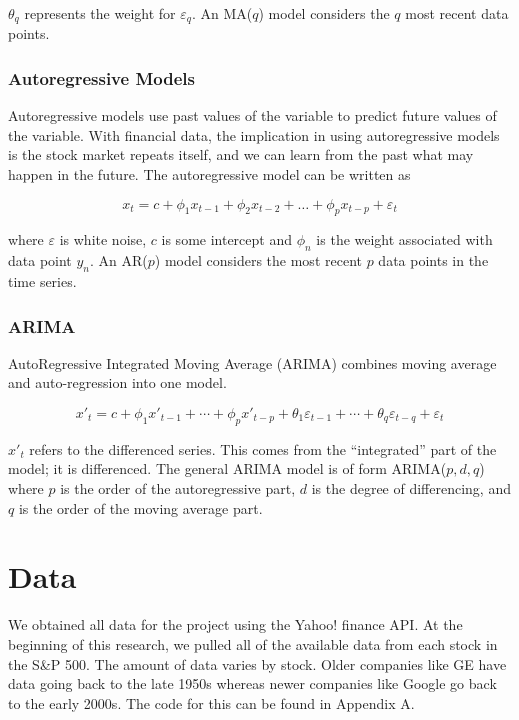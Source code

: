 \documentclass[12pt]{article}
\begin{document}
$\theta_q$ represents the weight for $\varepsilon_q$. An MA($q$) model considers the $q$ most recent data points. \cite[8.4]{forecasting}


\subsubsection{Autoregressive Models}
Autoregressive models use past values of the variable to predict future values of the variable. With financial data, the implication in using autoregressive models is the stock market repeats itself, and we can learn from the past what may happen in the future. \cite[8.3]{forecasting} The autoregressive model can be written as 

$$x_{t} = c + \phi_{1}x_{t-1} + \phi_{2}x_{t-2} + \dots + \phi_{p}x_{t-p} + \varepsilon_{t}$$

where $\varepsilon$ is white noise, $c$ is some intercept and $\phi_n$ is the weight associated with data point $y_n$. An AR($p$) model considers the most recent $p$ data points in the time series.

\subsubsection{ARIMA}
AutoRegressive Integrated Moving Average (ARIMA) combines moving average and auto-regression into one model. 

$$ x'_{t} = c + \phi_{1}x'_{t-1} + \cdots + \phi_{p}x'_{t-p} + \theta_{1}\varepsilon_{t-1} + \cdots + \theta_{q}\varepsilon_{t-q} + \varepsilon_{t} $$

$x'_t$ refers to the differenced series. This comes from the ``integrated'' part of the model; it is differenced. The general ARIMA model is of form ARIMA($p,d,q$) where $p$ is the order of the autoregressive part, $d$ is the degree of differencing, and $q$ is the order of the moving average part. \cite[8.5]{forecasting}

\section{Data}
We obtained all data for the project using the Yahoo! finance API. At the beginning of this research, we pulled all of the available data from each stock in the S\&P 500. The amount of data varies by stock. Older companies like GE have data going back to the late 1950s whereas newer companies like Google go back to the early 2000s. The code for this can be found in Appendix A.
\end{document}
